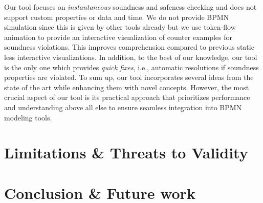 \documentclass[runningheads]{llncs}
\begin{document}
Our tool focuses on \textit{instantaneous} soundness and safeness checking and does not support custom properties or data and time.
We do not provide BPMN simulation since this is given by other tools already but we use token-flow animation to provide an interactive visualization of counter examples for soundness violations.
This improves comprehension compared to previous static less interactive visualizations.
In addition, to the best of our knowledge, our tool is the only one which provides \textit{quick fixes}, i.e., automatic resolutions if soundness properties are violated.
To sum up, our tool incorporates several ideas from the state of the art while enhancing them with novel concepts.
However, the most crucial aspect of our tool is its practical approach that prioritizes performance and understanding above all else to ensure seamless integration into BPMN modeling tools.

\section{Limitations \& Threats to Validity}


\section{Conclusion \& Future work}





\end{document}
